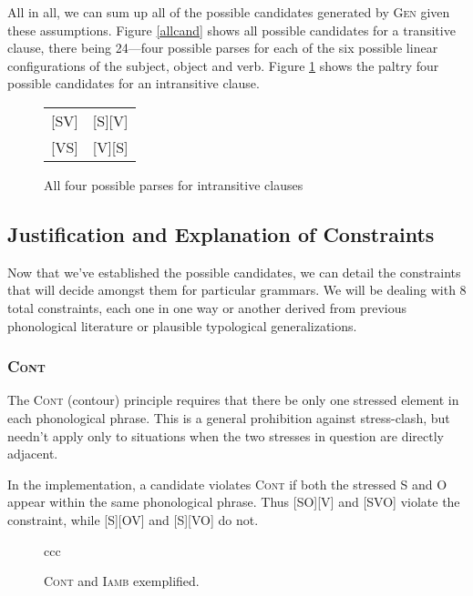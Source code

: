 \documentclass{article}
\newcommand{\cont}{\textsc{Cont}}
\newcommand{\iamb}{\textsc{Iamb}}
\begin{document}
All in all, we can sum up all of the possible candidates generated by \textsc{Gen} given these assumptions.
Figure \ref{allcand} shows all possible candidates for a transitive clause, there being 24---four possible parses for each of the six possible linear configurations of the subject, object and verb.
Figure \ref{instrans} shows the paltry four possible candidates for an intransitive clause.

\begin{figure}
	\begin{center}
		\begin{tabular}{cc}
			{}[SV]&[S][V]\\
			{}[VS]&[V][S]\\
		\end{tabular}
	\end{center}
	\caption{All four possible parses for intransitive clauses\label{instrans}}
\end{figure}

\subsection{Justification and Explanation of Constraints\label{straints}}

Now that we've established the possible candidates, we can detail the constraints that will decide amongst them for particular grammars.
We will be dealing with 8 total constraints, each one in one way or another derived from previous phonological literature or plausible typological generalizations.

\subsubsection{\cont}

The {\cont} (contour) principle requires that there be only one stressed element in each phonological phrase.
This is a general prohibition against stress-clash, but needn't apply only to situations when the two stresses in question are directly adjacent.

In the implementation, a candidate violates {\cont} if both the stressed S and O appear within the same phonological phrase.
Thus [SO][V] and [SVO] violate the constraint, while [S][OV] and [S][VO] do not.

\begin{figure}
\begin{center}
\begin{tableau}{ccc}
		\const{\cont}	\const{\iamb}
	\cand[\Optimal]{[S][OV]} \vio{}		\vio{}
	\cand{[S][VO]} \vio{}		\vio{*!}
	\cand{[SO][V]} \vio{*!}\vio{}
	\cand{[SOV]} \vio{*!}\vio{}
	\cand{[SVO]} \vio{*!}	\vio{*}
\end{tableau}
\end{center}
	\caption{\cont{} and {\iamb} exemplified.}
\end{figure}
\end{document}
